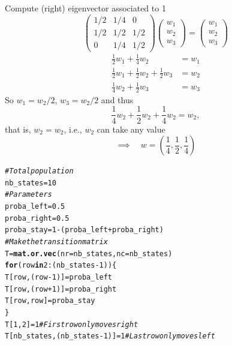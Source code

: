 \documentclass[aspectratio=169]{beamer}\usepackage[]{graphicx}\usepackage[]{xcolor}
\makeatletter
\newcommand{\hlnum}[1]{\textcolor[rgb]{0.686,0.059,0.569}{#1}}%
\newcommand{\hlcom}[1]{\textcolor[rgb]{0.678,0.584,0.686}{\textit{#1}}}%
\newcommand{\hlopt}[1]{\textcolor[rgb]{0,0,0}{#1}}%
\newcommand{\hldef}[1]{\textcolor[rgb]{0.345,0.345,0.345}{#1}}%
\newcommand{\hlkwa}[1]{\textcolor[rgb]{0.161,0.373,0.58}{\textbf{#1}}}%
\newcommand{\hlkwb}[1]{\textcolor[rgb]{0.69,0.353,0.396}{#1}}%
\newcommand{\hlkwc}[1]{\textcolor[rgb]{0.333,0.667,0.333}{#1}}%
\newcommand{\hlkwd}[1]{\textcolor[rgb]{0.737,0.353,0.396}{\textbf{#1}}}%
\newenvironment{kframe}{%
 \def\at@end@of@kframe{}%
 \ifinner\ifhmode%
  \def\at@end@of@kframe{\end{minipage}}%
  \begin{minipage}{\columnwidth}%
 \fi\fi%
 \def\FrameCommand##1{\hskip\@totalleftmargin \hskip-\fboxsep
 \colorbox{shadecolor}{##1}\hskip-\fboxsep
     \hskip-\linewidth \hskip-\@totalleftmargin \hskip\columnwidth}%
 \MakeFramed {\advance\hsize-\width
   \@totalleftmargin\z@ \linewidth\hsize
   \@setminipage}}%
 {\par\unskip\endMakeFramed%
 \at@end@of@kframe}
\newenvironment{knitrout}{}{} %
\makeatother
\begin{document}
\begin{frame}
Compute (right) eigenvector associated to 1
\[
\begin{pmatrix}
	1/2 & 1/4 & 0 \\
	1/2 & 1/2 & 1/2 \\
	0 & 1/4 & 1/2
\end{pmatrix}
\begin{pmatrix}
	w_1\\w_2\\w_3
\end{pmatrix}
=
\begin{pmatrix}
	w_1\\w_2\\w_3
\end{pmatrix}
\]
\begin{align*}
\frac 12 w_1+\frac 14 w_2 &= w_1 \\
\frac 12 w_1+\frac 12 w_2+\frac 12 w_3 &= w_2 \\
\frac 14 w_2+\frac 12 w_3 &= w_3
\end{align*}
So $w_1=w_2/2$, $w_3=w_2/2$ and thus
\[
\frac 14 w_2+\frac 12 w_2 +\frac 14 w_2=w_2,
\]
that is, $w_2=w_2$, i.e., $w_2$ can take any value
\vfill
\[
\implies\quad w=\left(\dfrac 14,\dfrac 12,\dfrac 14\right)
\]
\end{frame}

\begin{knitrout}
\color{fgcolor}\begin{kframe}
\begin{alltt}
\hlcom{# Total population}
\hldef{nb_states} \hlkwb{=} \hlnum{10}
\hlcom{# Parameters}
\hldef{proba_left} \hlkwb{=} \hlnum{0.5}
\hldef{proba_right} \hlkwb{=} \hlnum{0.5}
\hldef{proba_stay} \hlkwb{=} \hlnum{1}\hlopt{-}\hldef{(proba_left}\hlopt{+}\hldef{proba_right)}
\hlcom{# Make the transition matrix}
\hldef{T} \hlkwb{=} \hlkwd{mat.or.vec}\hldef{(}\hlkwc{nr} \hldef{= nb_states,} \hlkwc{nc} \hldef{= nb_states)}
\hlkwa{for} \hldef{(row} \hlkwa{in} \hlnum{2}\hlopt{:}\hldef{(nb_states}\hlopt{-}\hlnum{1}\hldef{)) \{}
  \hldef{T[row,(row}\hlopt{-}\hlnum{1}\hldef{)]} \hlkwb{=} \hldef{proba_left}
  \hldef{T[row,(row}\hlopt{+}\hlnum{1}\hldef{)]} \hlkwb{=} \hldef{proba_right}
  \hldef{T[row, row]} \hlkwb{=} \hldef{proba_stay}
\hldef{\}}
\hldef{T[}\hlnum{1}\hldef{,}\hlnum{2}\hldef{]} \hlkwb{=} \hlnum{1} \hlcom{# First row only moves right}
\hldef{T[nb_states, (nb_states}\hlopt{-}\hlnum{1}\hldef{)]} \hlkwb{=} \hlnum{1} \hlcom{# Last row only moves left}
\end{alltt}
\end{kframe}
\end{knitrout}
\end{document}

